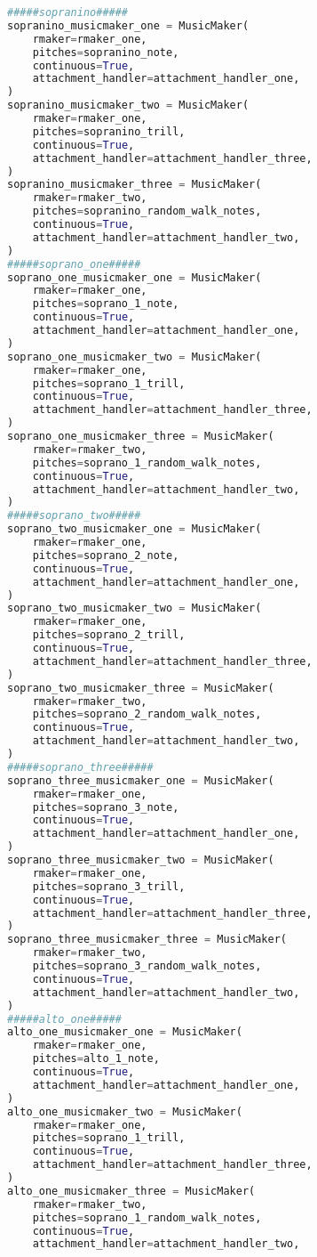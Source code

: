 \begin{lstlisting}[language=Python, caption=Invocation Source Code]
#####sopranino#####
sopranino_musicmaker_one = MusicMaker(
    rmaker=rmaker_one,
    pitches=sopranino_note,
    continuous=True,
    attachment_handler=attachment_handler_one,
)
sopranino_musicmaker_two = MusicMaker(
    rmaker=rmaker_one,
    pitches=sopranino_trill,
    continuous=True,
    attachment_handler=attachment_handler_three,
)
sopranino_musicmaker_three = MusicMaker(
    rmaker=rmaker_two,
    pitches=sopranino_random_walk_notes,
    continuous=True,
    attachment_handler=attachment_handler_two,
)
#####soprano_one#####
soprano_one_musicmaker_one = MusicMaker(
    rmaker=rmaker_one,
    pitches=soprano_1_note,
    continuous=True,
    attachment_handler=attachment_handler_one,
)
soprano_one_musicmaker_two = MusicMaker(
    rmaker=rmaker_one,
    pitches=soprano_1_trill,
    continuous=True,
    attachment_handler=attachment_handler_three,
)
soprano_one_musicmaker_three = MusicMaker(
    rmaker=rmaker_two,
    pitches=soprano_1_random_walk_notes,
    continuous=True,
    attachment_handler=attachment_handler_two,
)
#####soprano_two#####
soprano_two_musicmaker_one = MusicMaker(
    rmaker=rmaker_one,
    pitches=soprano_2_note,
    continuous=True,
    attachment_handler=attachment_handler_one,
)
soprano_two_musicmaker_two = MusicMaker(
    rmaker=rmaker_one,
    pitches=soprano_2_trill,
    continuous=True,
    attachment_handler=attachment_handler_three,
)
soprano_two_musicmaker_three = MusicMaker(
    rmaker=rmaker_two,
    pitches=soprano_2_random_walk_notes,
    continuous=True,
    attachment_handler=attachment_handler_two,
)
#####soprano_three#####
soprano_three_musicmaker_one = MusicMaker(
    rmaker=rmaker_one,
    pitches=soprano_3_note,
    continuous=True,
    attachment_handler=attachment_handler_one,
)
soprano_three_musicmaker_two = MusicMaker(
    rmaker=rmaker_one,
    pitches=soprano_3_trill,
    continuous=True,
    attachment_handler=attachment_handler_three,
)
soprano_three_musicmaker_three = MusicMaker(
    rmaker=rmaker_two,
    pitches=soprano_3_random_walk_notes,
    continuous=True,
    attachment_handler=attachment_handler_two,
)
#####alto_one#####
alto_one_musicmaker_one = MusicMaker(
    rmaker=rmaker_one,
    pitches=alto_1_note,
    continuous=True,
    attachment_handler=attachment_handler_one,
)
alto_one_musicmaker_two = MusicMaker(
    rmaker=rmaker_one,
    pitches=soprano_1_trill,
    continuous=True,
    attachment_handler=attachment_handler_three,
)
alto_one_musicmaker_three = MusicMaker(
    rmaker=rmaker_two,
    pitches=soprano_1_random_walk_notes,
    continuous=True,
    attachment_handler=attachment_handler_two,

\end{lstlisting}
